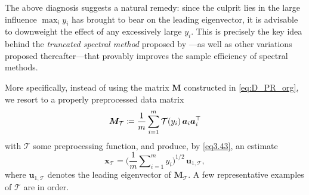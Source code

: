 The above diagnosis  suggests a natural remedy:
since the culprit lies in the  large influence $\max_i y_i$  has brought to bear on the leading eigenvector,
it is advisable to downweight the effect of any excessively large $y_i$.
This is precisely the key idea behind the {\em truncated spectral method} proposed by \citet{chen2015solving}---as well as other variations proposed thereafter---that provably improves the sample efficiency of spectral methods.


More specifically, instead of using the matrix $\bm{M}$ constructed in \eqref{eq:D_PR_org},
we resort to a properly preprocessed data matrix
%
\begin{equation}
	\label{eq:D_PR_T}
	\bm{M}_{\mathcal{T}} \coloneqq \frac{1}{m} \sum_{i=1}^m \mathcal{T}(y_i) \,\bm{a}_i \bm{a}_i^\top
\end{equation}
%
with $\mathcal{T}$ some preprocessing function, and produce, by \eqref{eq3.43}, an estimate%
%
\begin{equation}
	\label{eq:estimate-preprocess-PR}
	\bm{x}_{\mathcal{T}} = \Big( \frac{1}{m} \sum\nolimits_{i=1}^m y_i \Big)^{1/2} \, \bm{u}_{1,\mathcal{T}},
\end{equation}
%
where  $\bm{u}_{1,\mathcal{T}}$  denotes  the leading eigenvector of $\bm{M}_{\mathcal{T}}$.
A few representative examples of $\mathcal{T}$ are in order.
%
